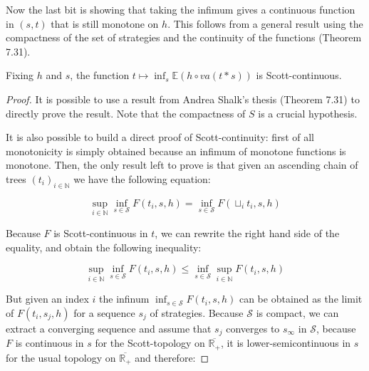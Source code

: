 Now the last bit is showing that taking the infimum gives 
a continuous function in $(s,t)$ that is still monotone on $h$.
This follows from a general result using the compactness of the 
set of strategies and the continuity of the functions 
\cite{AndreaShalk} (Theorem 7.31).

\begin{lemma}
    \label{lem:mixedscottcontinuous}
    Fixing $h$ and $s$, 
    the function $t \mapsto \inf_s \mathbb{E} (h \circ va(t*s))$
    is Scott-continuous.
\end{lemma}

\begin{proof}
    It is possible to use a result from Andrea Shalk's thesis 
    \cite{AndreaShalk} (Theorem 7.31)
    to directly prove the result. Note that 
    the compactness of $S$ is a crucial hypothesis. 

    It is also possible to build a direct proof of Scott-continuity:
    first of all monotonicity is simply obtained because an infimum 
    of monotone functions is monotone. Then, the only result left 
    to prove is that given an ascending chain of trees $(t_i)_{i \in \mathbb{N}}$
    we have the following equation:

    \begin{equation*}
        \sup_{i \in \mathbb{N}} \inf_{s \in \mathcal{S}} F(t_i,s,h) = 
    \inf_{s \in \mathcal{S}} F (\sqcup_i t_i, s, h)
    \end{equation*}
    
    Because $F$ is Scott-continuous in $t$, we can rewrite the right hand 
    side of the equality, and obtain the following inequality: 

    \begin{equation*}
        \sup_{i \in \mathbb{N}} \inf_{s \in \mathcal{S}} F(t_i,s,h) \leq 
        \inf_{s \in \mathcal{S}} \sup_{i \in \mathbb{N}} F (t_i, s, h)
    \end{equation*}
    
    But given an index $i$ the infinum $\inf_{s \in \mathcal{S}} F(t_i,s,h)$ 
    can be obtained as the limit of $F(t_i,s_j,h)$ for a sequence $s_j$ of
    strategies.
    Because 
    $\mathcal{S}$ is compact, we can extract a converging sequence and 
    assume that $s_j$ converges to $s_\infty$ in $\mathcal{S}$, because 
    $F$ is continuous in $s$ for the Scott-topology on
    $\overline{\mathbb{R}_+}$, it is lower-semicontinuous in $s$ 
    for the usual topology on $\overline{\mathbb{R}_+}$ and therefore:


\end{proof}
